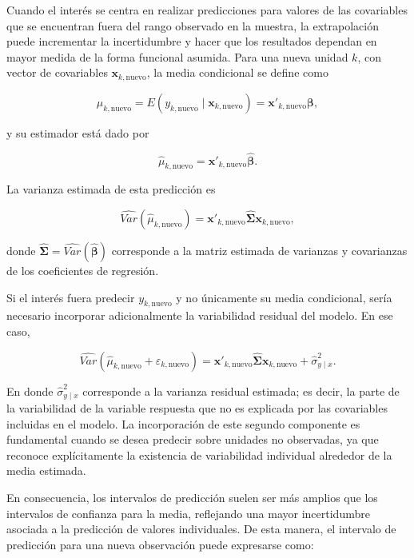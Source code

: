 \documentclass[
  spanish,
  11pt,
  letterpaper,
  oneside,
  open=any]{scrbook}
\begin{document}
Cuando el interés se centra en realizar predicciones para valores de las
covariables que se encuentran fuera del rango observado en la muestra,
la extrapolación puede incrementar la incertidumbre y hacer que los
resultados dependan en mayor medida de la forma funcional asumida. Para
una nueva unidad \(k\), con vector de covariables
\(\mathbf{x}_{k,\mathrm{nuevo}}\), la media condicional se define como

\[
\mu_{k,\mathrm{nuevo}}
=
E\left(
y_{k,\mathrm{nuevo}}
\mid
\mathbf{x}_{k,\mathrm{nuevo}}
\right)
=
\mathbf{x}'_{k,\mathrm{nuevo}}\boldsymbol{\beta},
\]

y su estimador está dado por

\[
\hat{\mu}_{k,\mathrm{nuevo}}
=
\mathbf{x}'_{k,\mathrm{nuevo}}
\hat{\boldsymbol{\beta}}.
\]

La varianza estimada de esta predicción es

\[
\widehat{Var}\left(
\hat{\mu}_{k,\mathrm{nuevo}}
\right)
=
\mathbf{x}'_{k,\mathrm{nuevo}}
\hat{\boldsymbol{\Sigma}}
\mathbf{x}_{k,\mathrm{nuevo}},
\]

donde
\(\hat{\boldsymbol{\Sigma}}=\widehat{Var}(\hat{\boldsymbol{\beta}})\)
corresponde a la matriz estimada de varianzas y covarianzas de los
coeficientes de regresión.

Si el interés fuera predecir \(y_{k,\mathrm{nuevo}}\) y no únicamente su
media condicional, sería necesario incorporar adicionalmente la
variabilidad residual del modelo. En ese caso,

\[
\widehat{Var}\left(
\hat{\mu}_{k,\mathrm{nuevo}} +
\varepsilon_{k,\mathrm{nuevo}}
\right)
=
\mathbf{x}'_{k,\mathrm{nuevo}}
\hat{\boldsymbol{\Sigma}}
\mathbf{x}_{k,\mathrm{nuevo}}
+
\hat{\sigma}^{2}_{y\mid x}.
\]

En donde \(\hat{\sigma}^{2}_{y\mid x}\) corresponde a la varianza
residual estimada; es decir, la parte de la variabilidad de la variable
respuesta que no es explicada por las covariables incluidas en el
modelo. La incorporación de este segundo componente es fundamental
cuando se desea predecir sobre unidades no observadas, ya que reconoce
explícitamente la existencia de variabilidad individual alrededor de la
media estimada.

En consecuencia, los intervalos de predicción suelen ser más amplios que
los intervalos de confianza para la media, reflejando una mayor
incertidumbre asociada a la predicción de valores individuales. De esta
manera, el intervalo de predicción para una nueva observación puede
expresarse como:
\end{document}

